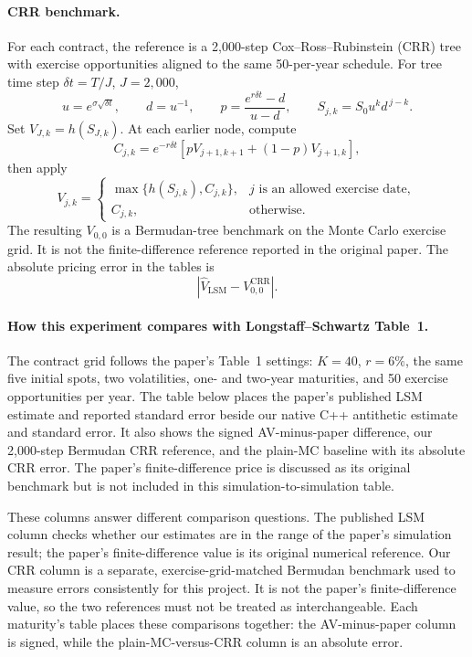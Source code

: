 \paragraph{CRR benchmark.}
For each contract, the reference is a 2,000-step Cox--Ross--Rubinstein
(CRR) tree with exercise opportunities aligned to the same 50-per-year
schedule. For tree time step \(\delta t=T/J\), \(J=2{,}000\),
\[
    u=e^{\sigma\sqrt{\delta t}},\qquad
    d=u^{-1},\qquad
    p=\frac{e^{r\delta t}-d}{u-d},\qquad
    S_{j,k}=S_0u^kd^{\,j-k}.
\]
Set \(V_{J,k}=h(S_{J,k})\). At each earlier node, compute
\[
    C_{j,k}
    =e^{-r\delta t}
      \left[pV_{j+1,k+1}+(1-p)V_{j+1,k}\right],
\]
then apply
\[
    V_{j,k}=
    \begin{cases}
        \max\{h(S_{j,k}),C_{j,k}\},
            & j\text{ is an allowed exercise date},\\
        C_{j,k},&\text{otherwise}.
    \end{cases}
\]
The resulting \(V_{0,0}\) is a Bermudan-tree benchmark on the Monte Carlo
exercise grid. It is not the finite-difference reference reported in the
original paper. The absolute pricing error in the tables is
\[
    \left|\widehat V_{\mathrm{LSM}}-V_{0,0}^{\mathrm{CRR}}\right|.
\]

\paragraph{How this experiment compares with Longstaff--Schwartz Table~1.}
The contract grid follows the paper's Table~1 settings:
\(K=40\), \(r=6\%\), the same five initial spots, two volatilities,
one- and two-year maturities, and 50 exercise opportunities per year.
The table below places the paper's published LSM estimate and reported
standard error beside our native C++ antithetic estimate and standard
error. It also shows the signed AV-minus-paper difference, our 2,000-step
Bermudan CRR reference, and the plain-MC baseline with its absolute CRR
error. The paper's finite-difference price is discussed as its original
benchmark but is not included in this simulation-to-simulation table.

These columns answer different comparison questions. The published LSM
column checks whether our estimates are in the range of the paper's
simulation result; the paper's finite-difference value is its original
numerical reference. Our CRR column is a separate, exercise-grid-matched
Bermudan benchmark used to measure errors consistently for this project.
It is not the paper's finite-difference value, so the two references must
not be treated as interchangeable. Each maturity's table places these
comparisons together: the AV-minus-paper column is signed, while the
plain-MC-versus-CRR column is an absolute error.

